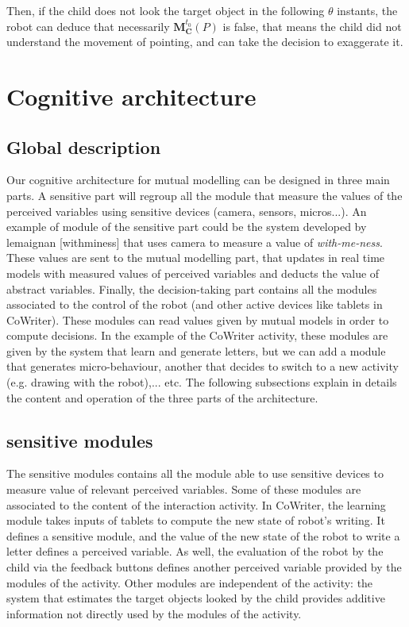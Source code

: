 \documentclass[10pt,a4paper,twocolumn]{article}
\begin{document}
Then, if the child does not look the target object in the following $\theta$ instants, the robot can deduce that necessarily  $\textbf{M}^{t_0}_\textbf{C}(P)$ is false, that means the child did not understand the movement of pointing, and can take the decision to exaggerate it. 


\section{Cognitive architecture}

\subsection{Global description}

Our cognitive architecture for mutual modelling can be designed in three main parts. A sensitive part will regroup all the module that measure the values of the perceived variables using sensitive devices (camera, sensors, micros...). An example of module of the sensitive part could be the system developed by lemaignan [withminess] that uses camera to measure a value of \textit{with-me-ness}. These values are sent to the mutual modelling part, that updates in real time models with measured values of perceived variables and deducts the value of abstract variables. Finally, the decision-taking part contains all the modules associated to the control of the robot (and other active devices like tablets in CoWriter). These modules can read values given by mutual models in order to compute decisions. In the example of the CoWriter activity, these modules are given by the system that learn and generate letters, but we can add a module that generates micro-behaviour, another that decides to switch to a new activity (e.g. drawing with the robot),... etc. The following subsections explain in details the content and operation of the three parts of the architecture. 

\subsection{sensitive modules}

The sensitive modules contains all the module able to use sensitive devices to measure value of relevant perceived variables. Some of these modules are associated to the content of the interaction activity. In CoWriter, the learning module takes inputs of tablets to compute the new state of robot's writing. It defines a sensitive module, and the value of the new state of the robot to write a letter defines a perceived variable. As well, the evaluation of the robot by the child via the feedback buttons defines another perceived variable provided by the modules of the activity. Other modules are independent of the activity: the system that estimates the target objects looked by the child provides additive information not directly used by the modules of the activity.  
\end{document}
